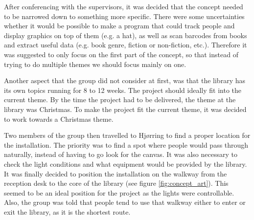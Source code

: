 After conferencing with the supervisors, it was decided that the concept needed to be narrowed down to something more specific. There were some uncertainties whether it would be possible to make a program that could track people and display graphics on top of them (e.g. a hat), as well as scan barcodes from books and extract useful data (e.g. book genre, fiction or non-fiction, etc.). Therefore it was suggested to only focus on the first part of the concept, so that instead of trying to do multiple themes we should focus mainly on one.

Another aspect that the group did not consider at first, was that the library has its own topics running for 8 to 12 weeks. The project should ideally fit into the current theme. By the time the project had to be delivered, the theme at the library was Christmas. To make the project fit the current theme, it was decided to work towards a Christmas theme.

Two members of the group then travelled to Hj{\o}rring to find a proper location for the installation. The priority was to find a spot where people would pass through naturally, instead of having to go look for the canvas. It was also necessary to check the light conditions and what equipment would be provided by the library. It was finally decided to position the installation on the walkway from the reception desk to the core of the library (see figure \ref{fig:concept_art}). This seemed to be an ideal position for the project as the lights were controllable. Also, the group was told that people tend to use that walkway either to enter or exit the library, as it is the shortest route. 


